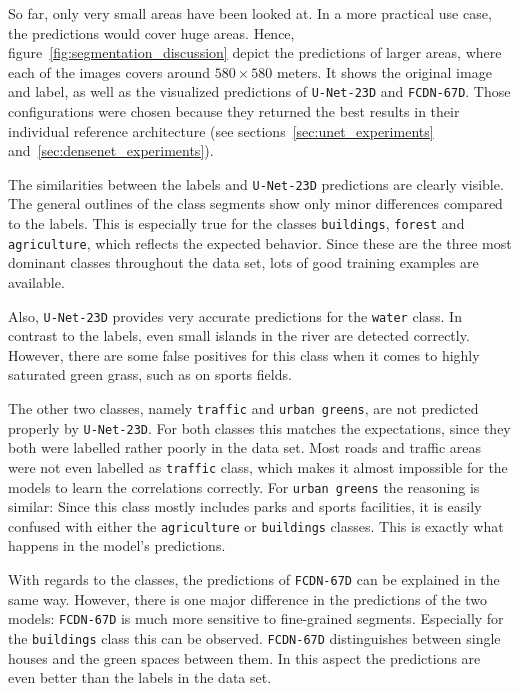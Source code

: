 So far, only very small areas have been looked at. In a more practical use case, the predictions would cover huge areas. Hence, figure~\ref{fig:segmentation_discussion} depict the predictions of larger areas, where each of the images covers around $580\times 580$ meters. It shows the original image and label, as well as the visualized predictions of \texttt{U-Net-23D} and \texttt{FCDN-67D}. Those configurations were chosen because they returned the best results in their individual reference architecture (see sections~\ref{sec:unet_experiments} and~\ref{sec:densenet_experiments}).

The similarities between the labels and \texttt{U-Net-23D} predictions are clearly visible. The general outlines of the class segments show only minor differences compared to the labels. This is especially true for the classes \texttt{buildings}, \texttt{forest} and \texttt{agriculture}, which reflects the expected behavior. Since these are the three most dominant classes throughout the data set, lots of good training examples are available.

Also, \texttt{U-Net-23D} provides very accurate predictions for the \texttt{water} class. In contrast to the labels, even small islands in the river are detected correctly. However, there are some false positives for this class when it comes to highly saturated green grass, such as on sports fields.

The other two classes, namely \texttt{traffic} and \texttt{urban greens}, are not predicted properly by \texttt{U-Net-23D}. For both classes this matches the expectations, since they both were labelled rather poorly in the data set. Most roads and traffic areas were not even labelled as \texttt{traffic} class, which makes it almost impossible for the models to learn the correlations correctly. For \texttt{urban greens} the reasoning is similar: Since this class mostly includes parks and sports facilities, it is easily confused with either the \texttt{agriculture} or \texttt{buildings} classes. This is exactly what happens in the model's predictions.

With regards to the classes, the predictions of \texttt{FCDN-67D} can be explained in the same way. However, there is one major difference in the predictions of the two models: \texttt{FCDN-67D} is much more sensitive to fine-grained segments. Especially for the \texttt{buildings} class this can be observed. \texttt{FCDN-67D} distinguishes between single houses and the green spaces between them. In this aspect the predictions are even better than the labels in the data set.


